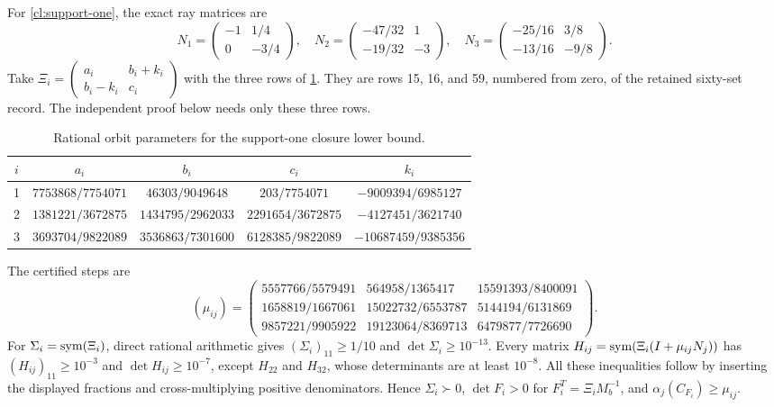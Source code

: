 For \cref{cl:support-one}, the exact ray matrices are
\[
 N_1=\begin{pmatrix}-1&1/4\\0&-3/4\end{pmatrix},\quad
 N_2=\begin{pmatrix}-47/32&1\\-19/32&-3\end{pmatrix},\quad
 N_3=\begin{pmatrix}-25/16&3/8\\-13/16&-9/8\end{pmatrix}.
\]
Take $\Xi_i=\left(\begin{smallmatrix}a_i&b_i+k_i\\b_i-k_i&c_i\end{smallmatrix}\right)$
with the three rows of \cref{cl:three-sets}. They are rows 15, 16, and 59,
numbered from zero, of the retained sixty-set record. The independent
proof below needs only these three rows.

\begin{table}[htbp]
\centering\small
\caption{Rational orbit parameters for the support-one closure lower bound.}
\label{cl:three-sets}
\begin{tabular}{ccccc}\toprule
$i$ &$a_i$ &$b_i$ &$c_i$ &$k_i$\\\midrule
1 &$7753868/7754071$ &$46303/9049648$ &$203/7754071$ &$-9009394/6985127$\\
2 &$1381221/3672875$ &$1434795/2962033$ &$2291654/3672875$ &$-4127451/3621740$\\
3 &$3693704/9822089$ &$3536863/7301600$ &$6128385/9822089$ &$-10687459/9385356$\\
\bottomrule\end{tabular}
\end{table}

The certified steps are
\[
 (\mu_{ij})=
 \begin{pmatrix}
 5557766/5579491&564958/1365417&15591393/8400091\\
 1658819/1667061&15022732/6553787&5144194/6131869\\
 9857221/9905922&19123064/8369713&6479877/7726690
 \end{pmatrix}.
\]
For $\Sigma_i=\operatorname{sym}(\Xi_i)$, direct rational arithmetic gives
$(\Sigma_i)_{11}\ge1/10$ and $\det\Sigma_i\ge10^{-13}$.
Every matrix
$H_{ij}=\operatorname{sym}(\Xi_i(I+\mu_{ij}N_j))$ has
$(H_{ij})_{11}\ge10^{-3}$ and $\det H_{ij}\ge10^{-7}$, except $H_{22}$
and $H_{32}$, whose determinants are at least $10^{-8}$.
All these inequalities follow by inserting the displayed fractions and
cross-multiplying positive denominators. Hence $\Sigma_i\succ0$,
$\det F_i>0$ for $F_i^T=\Xi_iM_b^{-1}$, and
$\alpha_j(C_{F_i})\ge\mu_{ij}$.

